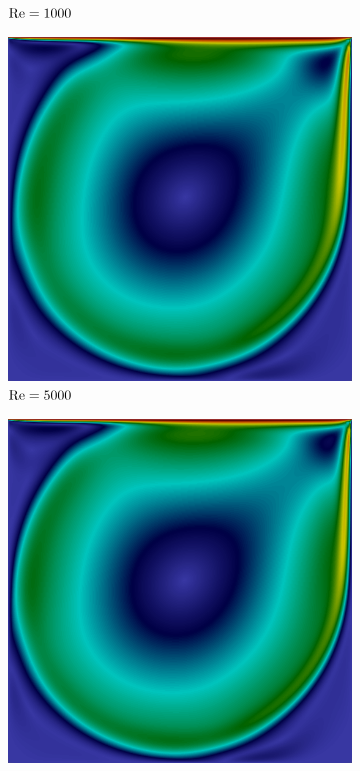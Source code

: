 \begin{figure}[h]
\begin{subfigure}{0.32\textwidth}
    \caption{$\mathrm{Re}=1000$}
    \end{subfigure}
    \begin{subfigure}{0.32\textwidth}
    \includegraphics[width=\linewidth]{Figuras/Cavity/Re5000.png}
    \caption{$\mathrm{Re}=5000$}
    \end{subfigure}
    \begin{subfigure}{0.32\textwidth}
    \includegraphics[width=\linewidth]{Figuras/Cavity/Re7500.png}

\end{subfigure}
\end{figure}
